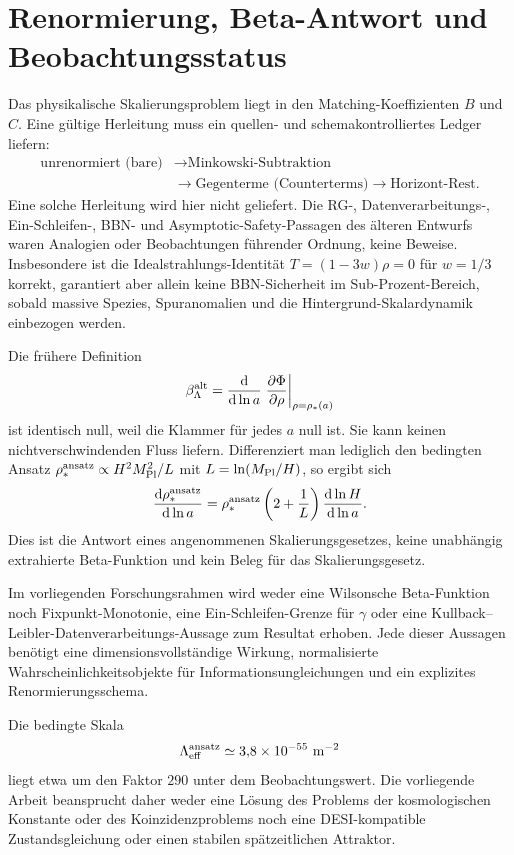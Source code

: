 \documentclass[12pt,a4paper]{article}
\theoremstyle{definition}
\theoremstyle{plain}
\theoremstyle{remark}
\newcommand{\Leff}{\Lambda_{\mathrm{eff}}}
\newcommand{\dd}{\mathrm{d}}
\begin{document}
\section{Renormierung, Beta-Antwort und Beobachtungsstatus}
\label{sec:renorm}

Das physikalische Skalierungsproblem liegt in den Matching-Koeffizienten
\(B\) und \(C\). Eine gültige Herleitung muss ein quellen- und
schemakontrolliertes Ledger liefern:
\begin{align*}
 \text{unrenormiert (bare)} &\longrightarrow \text{Minkowski-Subtraktion}\\
 &\longrightarrow \text{Gegenterme (Counterterms)} \longrightarrow \text{Horizont-Rest}.
\end{align*}
Eine solche Herleitung wird hier nicht geliefert. Die RG-, Datenverarbeitungs-,
Ein-Schleifen-, BBN- und Asymptotic-Safety-Passagen des älteren Entwurfs waren
Analogien oder Beobachtungen führender Ordnung, keine Beweise. Insbesondere
ist die Idealstrahlungs-Identität \(T=(1-3w)\rho=0\) für \(w=1/3\) korrekt,
garantiert aber allein keine BBN-Sicherheit im Sub-Prozent-Bereich, sobald
massive Spezies, Spuranomalien und die Hintergrund-Skalardynamik einbezogen
werden.

Die frühere Definition
\[
 \beta_\Lambda^{\rm alt}
 =\frac{\dd}{\dd\ln a}
 \left.\frac{\partial\Phi}{\partial\rho}\right|_{\rho=\rho_\ast(a)}
\]
ist identisch null, weil die Klammer für jedes \(a\) null ist. Sie kann keinen
nichtverschwindenden Fluss liefern. Differenziert man lediglich den bedingten
Ansatz \(\rho_\ast^{\rm ansatz}\propto H^2M_{\rm Pl}^2/L\) mit
\(L=\ln(M_{\rm Pl}/H)\), so ergibt sich
\begin{equation}\label{eq:beta-response}
 \frac{\dd\rho_\ast^{\rm ansatz}}{\dd\ln a}
 =\rho_\ast^{\rm ansatz}
 \left(2+\frac1L\right)\frac{\dd\ln H}{\dd\ln a}.
\end{equation}
Dies ist die Antwort eines angenommenen Skalierungsgesetzes, keine unabhängig
extrahierte Beta-Funktion und kein Beleg für das Skalierungsgesetz.

Im vorliegenden Forschungsrahmen wird weder eine Wilsonsche Beta-Funktion noch
Fixpunkt-Monotonie, eine Ein-Schleifen-Grenze für \(\gamma\) oder eine
Kullback--Leibler-Datenverarbeitungs-Aussage zum Resultat erhoben. Jede dieser
Aussagen benötigt eine dimensionsvollständige Wirkung, normalisierte
Wahrscheinlichkeitsobjekte für Informationsungleichungen und ein explizites
Renormierungsschema.

Die bedingte Skala
\[
 \Leff^{\rm ansatz}\simeq3{,}8\times10^{-55}\ {\rm m}^{-2}
\]
liegt etwa um den Faktor \(290\) unter dem Beobachtungswert. Die vorliegende Arbeit
beansprucht daher weder eine Lösung des Problems der kosmologischen Konstante
oder des Koinzidenzproblems noch eine DESI-kompatible Zustandsgleichung oder einen
stabilen spätzeitlichen Attraktor.
\end{document}
